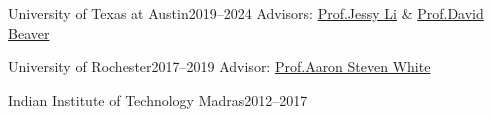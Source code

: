     {University of Texas at Austin}{2019--2024}
\vspace{0.15em}
Advisors: \href{https://jessyli.com}{Prof.Jessy Li} \& \href{https://liberalarts.utexas.edu/linguistics/faculty/dib97}{Prof.David Beaver}

\vspace{0.15em}

    {University of Rochester}{2017--2019}
\vspace{0.15em}
Advisor: \href{http://aaronstevenwhite.io}{Prof.Aaron Steven White}

\vspace{0.15em}

    {Indian Institute of Technology Madras}{2012--2017}
